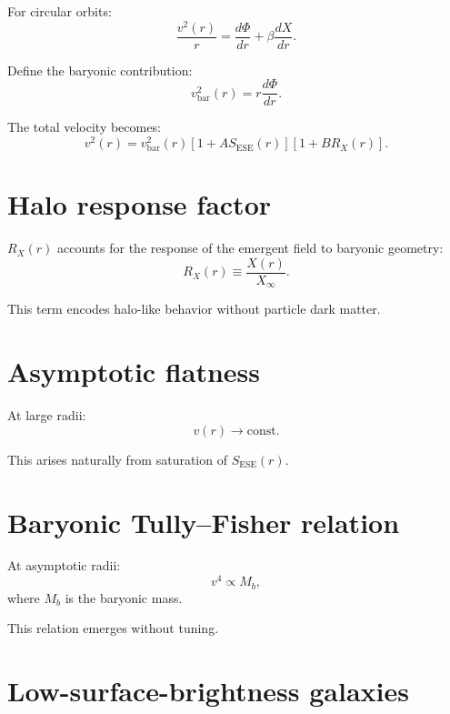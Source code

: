 \documentclass[11pt]{book}
\newcommand{\ESE}{\mathrm{ESE}}
\begin{document}
For circular orbits:
\begin{equation}
\frac{v^2(r)}{r}
=
\frac{d\Phi}{dr}
+
\beta \frac{dX}{dr}.
\end{equation}

Define the baryonic contribution:
\begin{equation}
v_{\mathrm{bar}}^2(r) = r \frac{d\Phi}{dr}.
\end{equation}

The total velocity becomes:
\begin{equation}
v^2(r)
=
v_{\mathrm{bar}}^2(r)
\left[
1 + A S_{\ESE}(r)
\right]
\left[
1 + B R_X(r)
\right].
\end{equation}

\section{Halo response factor}

$R_X(r)$ accounts for the response of the emergent field to baryonic
geometry:
\begin{equation}
R_X(r) \equiv \frac{X(r)}{X_\infty}.
\end{equation}

This term encodes halo-like behavior without particle dark matter.

\section{Asymptotic flatness}

At large radii:
\begin{equation}
v(r) \to \mathrm{const}.
\end{equation}

This arises naturally from saturation of $S_{\ESE}(r)$.

\section{Baryonic Tully--Fisher relation}

At asymptotic radii:
\begin{equation}
v^4 \propto M_b,
\end{equation}
where $M_b$ is the baryonic mass.

This relation emerges without tuning.

\section{Low-surface-brightness galaxies}
\end{document}
